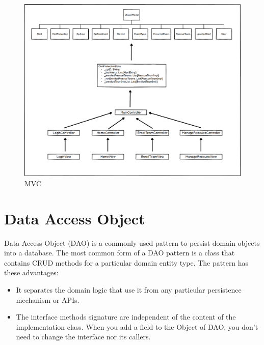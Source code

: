 \documentclass[a4paper,12pt]{report}
\begin{document}
\begin{figure}[ht]
\centering
\includegraphics[width=\textwidth]{figures/MVC.png}
\caption{MVC}
\label{fig:MVC}
\end{figure}





\section{Data Access Object}
Data Access Object (DAO) is a commonly used pattern to persist domain objects into a database. The most common form of a DAO pattern is a class that contains CRUD methods for a particular domain entity type.
The pattern has these advantages:
\begin{itemize}
\item It separates the domain logic that use it from any particular persistence mechanism or APIs.
\item The interface methods signature are independent of the content of the implementation class. When you add a field to the Object of DAO, you don’t need to change the interface nor its callers.
\end{itemize}
\end{document}
